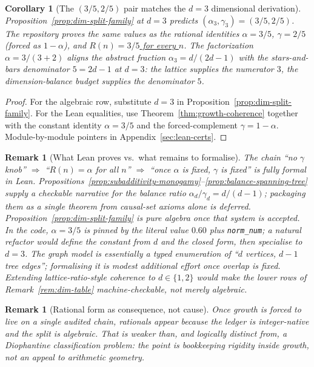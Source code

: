 \documentclass[11pt]{amsart}
\newtheorem{corollary}[theorem]{Corollary}
\newtheorem{remark}[theorem]{Remark}
\begin{document}
\begin{corollary}[The \((3/5,2/5)\) pair matches the \(d=3\) dimensional derivation]
\label{cor:three-fifths-two-fifths}
Proposition~\ref{prop:dim-split-family} at \(d=3\) predicts \((\alpha_3,\gamma_3)=(3/5,2/5)\). The repository proves the same values as the rational identities \hyperref[lean:alpha-3-5]{\(\alpha=3/5\)}, \hyperref[lean:gamma-complement]{\(\gamma=2/5\)} (forced as \(1-\alpha\)), and \hyperref[lean:imprint-3-5]{\(R(n)=3/5\) for every \(n\)}. The factorization \(\alpha=3/(3+2)\) aligns the abstract fraction \(\alpha_3=d/(2d-1)\) with the stars-and-bars denominator \(5=2d-1\) at \(d=3\): the lattice supplies the numerator \(3\), the dimension-balance budget supplies the denominator \(5\).
\end{corollary}

\begin{proof}
For the algebraic row, substitute \(d=3\) in Proposition~\ref{prop:dim-split-family}. For the Lean equalities, use Theorem~\ref{thm:growth-coherence} together with the constant identity \(\alpha=3/5\) and the forced-complement \(\gamma=1-\alpha\). Module-by-module pointers in Appendix~\ref{sec:lean-certs}.
\end{proof}

\begin{remark}[What Lean proves vs.\ what remains to formalise]
\label{rem:lean-vs-narrative}
The chain ``no \(\gamma\) knob'' \(\Rightarrow\) ``\(R(n)=\alpha\) for all \(n\)'' \(\Rightarrow\) ``once \(\alpha\) is fixed, \(\gamma\) is fixed'' is fully formal in Lean. Propositions~\ref{prop:subadditivity-monogamy}--\ref{prop:balance-spanning-tree} supply a checkable narrative for the balance ratio \(\alpha_d/\gamma_d=d/(d-1)\); packaging them as a single theorem from causal-set axioms alone is deferred. Proposition~\ref{prop:dim-split-family} is pure algebra once that system is accepted. In the code, \(\alpha=3/5\) is pinned by the literal value \(0.60\) plus \texttt{norm\_num}; a natural refactor would define the constant from \(d\) and the closed form, then specialise to \(d=3\). The graph model is essentially a typed enumeration of ``\(d\) vertices, \(d-1\) tree edges''; formalising it is modest additional effort once overlap is fixed. Extending lattice-ratio-style coherence to \(d\in\{1,2\}\) would make the lower rows of Remark~\ref{rem:dim-table} machine-checkable, not merely algebraic.
\end{remark}

\begin{remark}[Rational form as consequence, not cause]
Once growth is forced to live on a single audited chain, rationals appear because the ledger is integer-native and the split is algebraic. That is weaker than, and logically distinct from, a Diophantine classification problem: the point is \emph{bookkeeping rigidity inside growth}, not an appeal to arithmetic geometry.
\end{remark}
\end{document}
